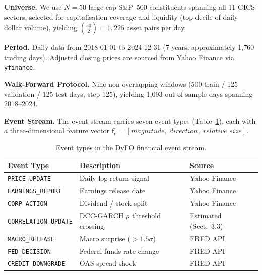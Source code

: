 \documentclass[runningheads]{llncs}
\begin{document}
\textbf{Universe.}
We use $N=50$ large-cap S\&P~500 constituents spanning all 11 GICS sectors, selected for capitalisation coverage and liquidity (top decile of daily dollar volume), yielding $\binom{50}{2} = 1{,}225$ asset pairs per day.

\textbf{Period.} Daily data from 2018-01-01 to 2024-12-31 (7 years, approximately 1{,}760 trading days). Adjusted closing prices are sourced from Yahoo Finance via \texttt{yfinance}.


\textbf{Walk-Forward Protocol.} Nine non-overlapping windows (500 train / 125 validation / 125 test days, step 125), yielding 1{,}093 out-of-sample days spanning 2018--2024.

\noindent\textbf{Event Stream.} The event stream carries seven event types (Table~\ref{tab:event_stream}), each with a three-dimensional feature vector $\mathbf{f}_e = [\mathit{magnitude},\;  \allowbreak \mathit{direction},\; \allowbreak \mathit{relative\_size}]$.

\begin{table}[ht]
\caption{Event types in the DyFO financial event stream.}
\label{tab:event_stream}
\centering
\begin{tabular}{|l|l|l|}
\hline
\textbf{Event Type} & \textbf{Description} & \textbf{Source} \\
\hline
\texttt{PRICE\_UPDATE} & Daily log-return signal & Yahoo Finance \\
\texttt{EARNINGS\_REPORT} & Earnings release date & Yahoo Finance \\
\texttt{CORP\_ACTION} & Dividend / stock split & Yahoo Finance \\
\texttt{CORRELATION\_UPDATE} & DCC-GARCH $\rho$ threshold crossing & Estimated (Sect.~3.3) \\
\texttt{MACRO\_RELEASE} & Macro surprise ($> 1.5\sigma$) & FRED API \\
\texttt{FED\_DECISION} & Federal funds rate change & FRED API \\
\texttt{CREDIT\_DOWNGRADE} & OAS spread shock & FRED API \\
\hline
\end{tabular}
\end{table}
\end{document}
